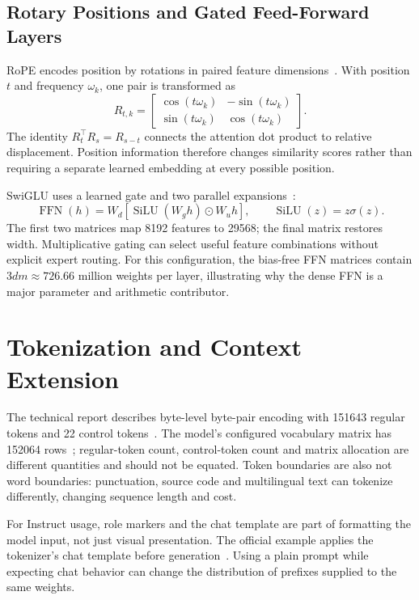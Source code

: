 \documentclass[conference]{IEEEtran}
\begin{document}
\subsection{Rotary Positions and Gated Feed-Forward Layers}
RoPE encodes position by rotations in paired feature dimensions~\cite{rope}. With position $t$ and frequency $\omega_k$, one pair is transformed as
\begin{equation}
R_{t,k}=\begin{bmatrix}\cos(t\omega_k)&-\sin(t\omega_k)\\
\sin(t\omega_k)&\cos(t\omega_k)\end{bmatrix}.
\end{equation}
The identity $R_t^\top R_s=R_{s-t}$ connects the attention dot product to relative displacement. Position information therefore changes similarity scores rather than requiring a separate learned embedding at every possible position.

SwiGLU uses a learned gate and two parallel expansions~\cite{glu}:
\begin{equation}
\operatorname{FFN}(h)=W_d\!\left[
\operatorname{SiLU}(W_gh)\odot W_uh\right],\qquad
\operatorname{SiLU}(z)=z\sigma(z).
\end{equation}
The first two matrices map 8192 features to 29568; the final matrix restores width. Multiplicative gating can select useful feature combinations without explicit expert routing. For this configuration, the bias-free FFN matrices contain $3dm\approx726.66$ million weights per layer, illustrating why the dense FFN is a major parameter and arithmetic contributor.

\section{Tokenization and Context Extension}
The technical report describes byte-level byte-pair encoding with 151643 regular tokens and 22 control tokens~\cite{report}. The model's configured vocabulary matrix has 152064 rows~\cite{config}; regular-token count, control-token count and matrix allocation are different quantities and should not be equated. Token boundaries are also not word boundaries: punctuation, source code and multilingual text can tokenize differently, changing sequence length and cost.

For Instruct usage, role markers and the chat template are part of formatting the model input, not just visual presentation. The official example applies the tokenizer's chat template before generation~\cite{card}. Using a plain prompt while expecting chat behavior can change the distribution of prefixes supplied to the same weights.
\end{document}
